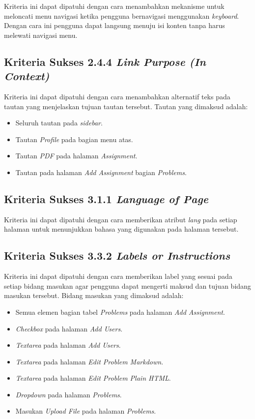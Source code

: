Kriteria ini dapat dipatuhi dengan cara menambahkan mekanisme untuk meloncati menu navigasi ketika pengguna bernavigasi menggunakan \textit{keyboard}. Dengan cara ini pengguna dapat langsung menuju isi konten tanpa harus melewati navigasi menu.

\subsection{Kriteria Sukses 2.4.4 \textit{Link Purpose (In Context)}}
\label{subsec:peningkatan_A_2.4.4}

Kriteria ini dapat dipatuhi dengan cara menambahkan alternatif teks pada tautan yang menjelaskan tujuan tautan tersebut. Tautan yang dimaksud adalah:

\begin{itemize}
	\item Seluruh tautan pada \textit{sidebar}.
	\item Tautan \textit{Profile} pada bagian menu atas.
	\item Tautan \textit{PDF} pada halaman \textit{Assignment}.
	\item Tautan pada halaman \textit{Add Assignment} bagian \textit{Problems}.
\end{itemize}

\subsection{Kriteria Sukses 3.1.1 \textit{Language of Page}}
\label{subsec:peningkatan_A_3.1.1}

Kriteria ini dapat dipatuhi dengan cara memberikan atribut \textit{lang} pada setiap halaman untuk menunjukkan bahasa yang digunakan pada halaman tersebut.

\subsection{Kriteria Sukses 3.3.2 \textit{Labels or Instructions}}
\label{subsec:peningkatan_A_3.3.2}

Kriteria ini dapat dipatuhi dengan cara memberikan label yang sesuai pada setiap bidang masukan agar pengguna dapat mengerti maksud dan tujuan bidang masukan tersebut. Bidang masukan yang dimaksud adalah:

\begin{itemize}
	\item Semua elemen bagian tabel \textit{Problems} pada halaman \textit{Add Assignment}.
	\item \textit{Checkbox} pada halaman \textit{Add Users}.
	\item \textit{Textarea} pada halaman \textit{Add Users}.
	\item \textit{Textarea} pada halaman \textit{Edit Problem Markdown}.
	\item \textit{Textarea} pada halaman \textit{Edit Problem Plain HTML}.
	\item \textit{Dropdown} pada halaman \textit{Problems}.
	\item Masukan \textit{Upload File} pada halaman \textit{Problems}.
\end{itemize}

